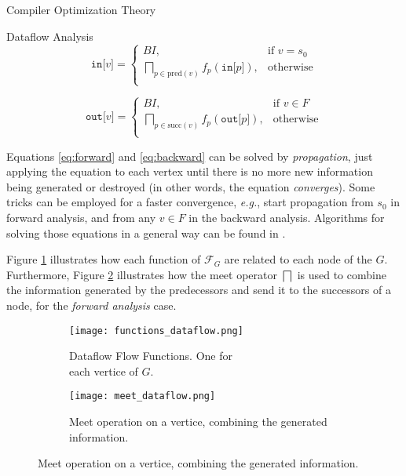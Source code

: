 \begin{section}{Compiler Optimization Theory}
\begin{subsection}{Dataflow Analysis}
\begin{equation}\label{eq:forward}
	\texttt{in[} v \texttt{]} = \begin{cases}
	  BI,& \text{if } v = s_0 \\
	  \bigsqcap_{p \in \text{pred}(v)}f_p(\texttt{in[}p\texttt{]}) ,& \text{otherwise} \\
	\end{cases}
\end{equation}

\begin{equation}\label{eq:backward}
	\texttt{out[} v \texttt{]} = \begin{cases}
	  BI,& \text{if } v \in F \\
	  \bigsqcap_{p \in \text{succ}(v)}f_p(\texttt{out[}p\texttt{]}) ,& \text{otherwise} \\
	\end{cases}
\end{equation}

Equations \ref{eq:forward} and \ref{eq:backward} can be solved by
\textit{propagation}, just applying the equation to each vertex until there is
no more new information being generated or destroyed (in other 	words, the
equation \textit{converges}). Some tricks can be employed for a faster
convergence, \textit{e.g.}, start propagation from $s_0$ in forward analysis,
and from any $v \in F$ in the backward analysis.  Algorithms for solving those
equations in a general way can be found in \citep{khedker2009data}.

Figure \ref{fig:functions_dataflow} illustrates how each function of
$\mathcal{F}_G$ are related to each node of the $G$. Furthermore, Figure
\ref{fig:meet_dataflow} illustrates how the meet operator $\bigsqcap$ is used
to combine the information generated by the predecessors and send it to the
successors of a node, for the \textit{forward analysis} case.

\begin{figure}[ht]
\centering
  \begin{subfigure}[b]{0.40\textwidth}
	 \texttt{[image: functions\_dataflow.png]}
	  \caption{Dataflow Flow Functions. One for \\ each vertice of $G$. \citep{khedker2009data}}
	  \label{fig:functions_dataflow}
  \end{subfigure}
  \begin{subfigure}[b]{0.40\textwidth}
	 \texttt{[image: meet\_dataflow.png]}
	  \caption{Meet operation on a vertice, combining the generated information. \citep{khedker2009data}}
	  \label{fig:meet_dataflow}
  \end{subfigure}
  \label{fig:dataflow}
\end{figure}


\end{subsection}
\end{section}

